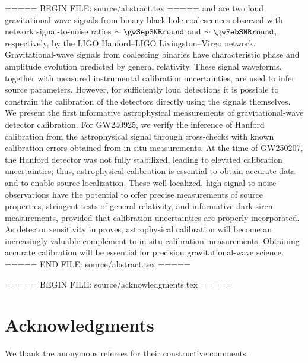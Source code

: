 ===== BEGIN FILE: source/abstract.tex =====
 and  are two loud gravitational-wave signals from binary black hole coalescences observed with network signal-to-noise ratios $\sim\gwSepSNRround$ and $\sim\gwFebSNRround$, respectively, by the LIGO Hanford--LIGO Livingston--Virgo network.
Gravitational-wave signals from coalescing binaries have characteristic phase and amplitude evolution predicted by general relativity.
These signal waveforms, together with measured instrumental calibration uncertainties, are used to infer source parameters.
However, for sufficiently loud detections it is possible to constrain the calibration of the detectors directly using the signals themselves.
We present the first informative astrophysical measurements of gravitational-wave detector calibration.
For \ac{GW240925}, we verify the inference of Hanford calibration from the astrophysical signal through cross-checks with known calibration errors obtained from in-situ measurements.
At the time of \ac{GW250207}, the Hanford detector was not fully stabilized, leading to elevated calibration uncertainties; thus, astrophysical calibration is essential to obtain accurate data and to enable source localization.
These well-localized, high signal-to-noise observations have the potential to offer precise measurements of source properties, stringent tests of general relativity, and informative dark siren measurements, provided that calibration uncertainties are properly incorporated.
As detector sensitivity improves, astrophysical calibration will become an increasingly valuable complement to in-situ calibration measurements.
Obtaining accurate calibration will be essential for precision gravitational-wave science.
===== END FILE: source/abstract.tex =====

===== BEGIN FILE: source/acknowledgments.tex =====
\section*{Acknowledgments}

We thank the anonymous referees for their constructive comments.


